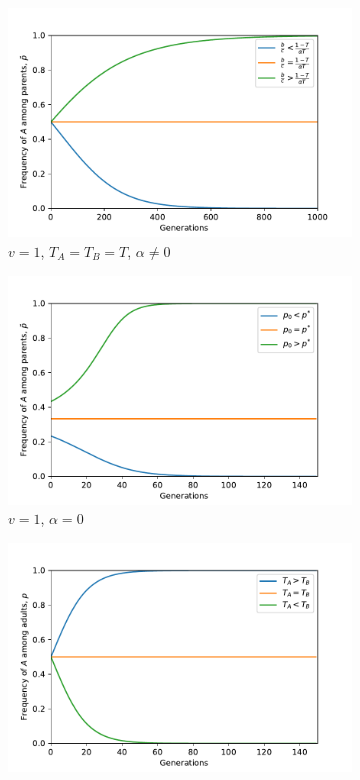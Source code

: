\documentclass[12pt]{extarticle}
\begin{document}
\begin{figure}[H]
  \centering
  \begin{subfigure}{8cm}
    \includegraphics[scale=0.5]{figure2a.pdf}
    \caption{$v=1$, $T_A=T_B=T$, $\alpha \neq 0$}
    \label{fig:results_a}
  \end{subfigure}
  \begin{subfigure}{8cm}
    \includegraphics[scale=0.5]{figure2b.pdf}
    \caption{$v=1$, $\alpha = 0$}
    \label{fig:results_b}
  \end{subfigure}
  \begin{subfigure}{8cm}
    \includegraphics[scale=0.5]{figure2c.pdf}

\end{subfigure}
\end{figure}
\end{document}
